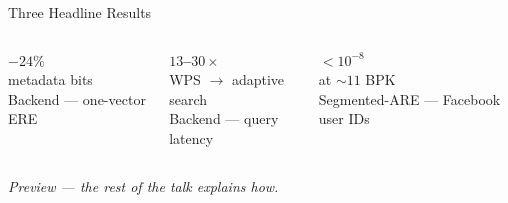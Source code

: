 \begin{frame}{Three Headline Results}
  \begin{columns}[c,onlytextwidth]
    \centering
    {\Huge\bfseries\textcolor{thAccent1}{$-24\%$}}\\[0.4em]
    {\small metadata bits}\\
    {\footnotesize Backend — one-vector ERE}

    \centering
    {\Huge\bfseries\textcolor{thAccent2}{$13$--$30\times$}}\\[0.4em]
    {\small WPS $\to$ adaptive search}\\
    {\footnotesize Backend — query latency}

    \centering
    {\Huge\bfseries\textcolor{thScanARE}{$<\!10^{-8}$}}\\[0.4em]
    {\small at $\sim 11$ BPK}\\
    {\footnotesize Segmented-ARE — Facebook user IDs}
  \end{columns}
  \vspace{1em}
  \centering
  \emph{Preview — the rest of the talk explains how.}
\end{frame}
